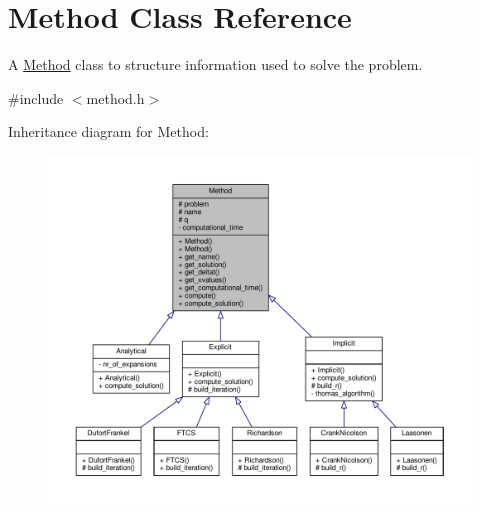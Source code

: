 \hypertarget{classMethod}{}\section{Method Class Reference}
\label{classMethod}


A \hyperlink{classMethod}{Method} class to structure information used to solve the problem.  




{\ttfamily \#include $<$method.\+h$>$}



Inheritance diagram for Method\+:
\nopagebreak
\begin{figure}[H]
\begin{center}
\leavevmode
\includegraphics[width=350pt]{classMethod__inherit__graph}
\end{center}
\end{figure}


